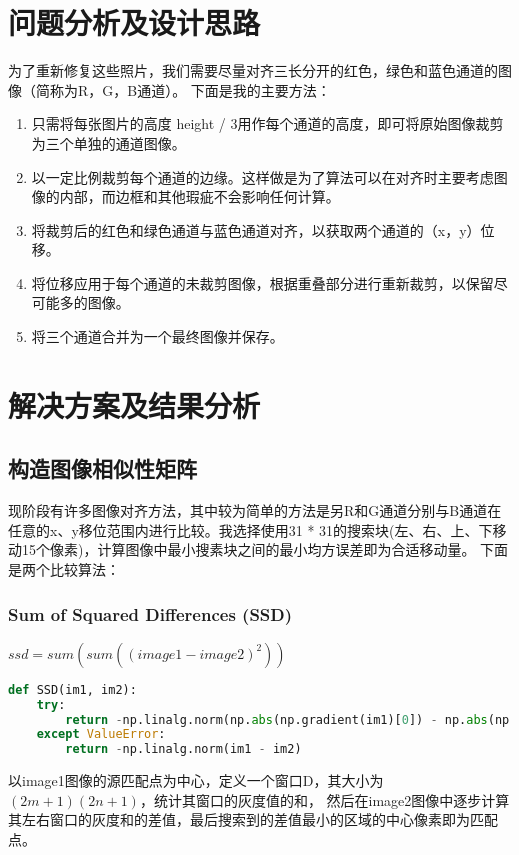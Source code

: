 \documentclass[withoutpreface,bwprint]{cumcmthesis} %
\begin{document}
\section{问题分析及设计思路}
为了重新修复这些照片，我们需要尽量对齐三长分开的红色，绿色和蓝色通道的图像（简称为R，G，B通道）。
下面是我的主要方法：
\begin{enumerate}[itemindent=2em]  %
    \item 只需将每张图片的高度 height / 3用作每个通道的高度，即可将原始图像裁剪为三个单独的通道图像。
    \item 以一定比例裁剪每个通道的边缘。这样做是为了算法可以在对齐时主要考虑图像的内部，而边框和其他瑕疵不会影响任何计算。
    \item 将裁剪后的红色和绿色通道与蓝色通道对齐，以获取两个通道的（x，y）位移。
    \item 将位移应用于每个通道的未裁剪图像，根据重叠部分进行重新裁剪，以保留尽可能多的图像。
    \item 将三个通道合并为一个最终图像并保存。
\end{enumerate}

\section{解决方案及结果分析}

\subsection{构造图像相似性矩阵}

现阶段有许多图像对齐方法，其中较为简单的方法是另R和G通道分别与B通道在任意的x、y移位范围内进行比较。我选择使用31 * 31的搜索块(左、右、上、下移动15个像素)，计算图像中最小搜素块之间的最小均方误差即为合适移动量。
下面是两个比较算法：
\subsubsection*{Sum of Squared Differences (SSD)}
$ssd = sum( sum( (image1 - image2) ^ 2 ) )$
\begin{lstlisting}[language=python]
def SSD(im1, im2):
	try:
		return -np.linalg.norm(np.abs(np.gradient(im1)[0]) - np.abs(np.gradient(im2)[0])) - np.linalg.norm(np.abs(np.gradient(im1)[1]) - np.abs(np.gradient(im2)[1]))
	except ValueError:
		return -np.linalg.norm(im1 - im2)
\end{lstlisting}



以image1图像的源匹配点为中心，定义一个窗口D，其大小为$(2m+1)(2n+1)$，统计其窗口的灰度值的和，
然后在image2图像中逐步计算其左右窗口的灰度和的差值，最后搜索到的差值最小的区域的中心像素即为匹配点。
\end{document}

